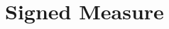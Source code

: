 \section{Signed Measure}


\begin{figure}[H]
	\centering
	\label{fig:thm:Hahn-decomposition-theorem}
\end{figure}
